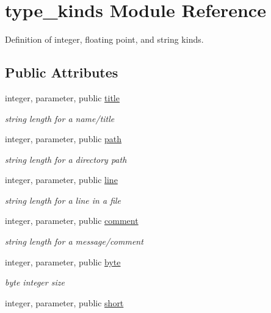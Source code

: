 \hypertarget{classtype__kinds}{\section{type\+\_\+kinds Module Reference}
\label{classtype__kinds}
}


Definition of integer, floating point, and string kinds.  


\subsection*{Public Attributes}
\begin{DoxyCompactItemize}
\item 
integer, parameter, public \hyperlink{classtype__kinds_aa2f577aea616d9b9bb91ce438bdf3c02}{title}
\begin{DoxyCompactList}\small\item\em string length for a name/title \end{DoxyCompactList}\item 
integer, parameter, public \hyperlink{classtype__kinds_a05ab6f6ff4279480c4fd6d8b04a3efbf}{path}
\begin{DoxyCompactList}\small\item\em string length for a directory path \end{DoxyCompactList}\item 
integer, parameter, public \hyperlink{classtype__kinds_af0560ef37c612847670ffbfba8a9bc33}{line}
\begin{DoxyCompactList}\small\item\em string length for a line in a file \end{DoxyCompactList}\item 
integer, parameter, public \hyperlink{classtype__kinds_abb1584a815b1c1b79301d6f922366eec}{comment}
\begin{DoxyCompactList}\small\item\em string length for a message/comment \end{DoxyCompactList}\item 
integer, parameter, public \hyperlink{classtype__kinds_a13366a08a0935a72c203e1b880b4d49e}{byte}
\begin{DoxyCompactList}\small\item\em byte integer size \end{DoxyCompactList}\item 
integer, parameter, public \hyperlink{classtype__kinds_ab4d7bfce672e6152e78f87f8aa5b2e04}{short}

\end{DoxyCompactItemize}
